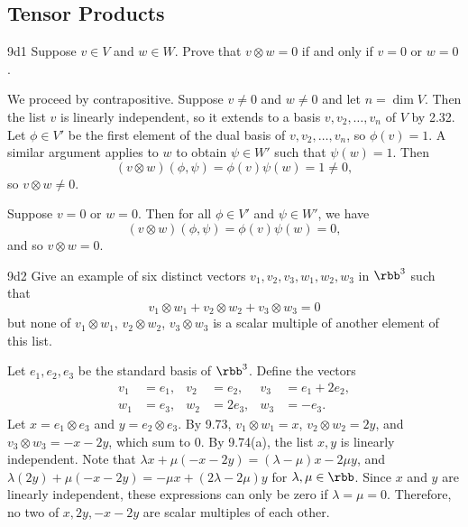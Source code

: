 \subsection{Tensor Products}

\begin{exercise}{9d1}
    Suppose $v \in V$ and $w \in W$.
    Prove that $v \otimes w = 0$ if and only if $v = 0$ or $w = 0$.
\end{exercise}

\begin{soliff}
    \rightimp We proceed by contrapositive.
    Suppose $v \neq 0$ and $w \neq 0$ and let $n = \dim V$.
    Then the list $v$ is linearly independent, so it extends to a basis $v, v_2, \ldots, v_n$ of $V$ by 2.32.
    Let $\phi \in V'$ be the first element of the dual basis of $v, v_2, \ldots, v_n$, so $\phi(v) = 1$.
    A similar argument applies to $w$ to obtain $\psi \in W'$ such that $\psi(w) = 1$.
    Then
    \[
        (v \otimes w)(\phi, \psi) = \phi(v)\psi(w) = 1 \neq 0,
    \]
    so $v \otimes w \neq 0$.

    \leftimp Suppose $v = 0$ or $w = 0$.
    Then for all $\phi \in V'$ and $\psi \in W'$, we have
    \[
        (v \otimes w)(\phi, \psi) = \phi(v)\psi(w) = 0,
    \]
    and so $v \otimes w = 0$.
\end{soliff}

\begin{exercise}{9d2}
    Give an example of six distinct vectors $v_1, v_2, v_3, w_1, w_2, w_3$ in $\rbb^3$ such that
    \[
        v_1 \otimes w_1 + v_2 \otimes w_2 + v_3 \otimes w_3 = 0
    \]
    but none of $v_1 \otimes w_1$, $v_2 \otimes w_2$, $v_3 \otimes w_3$ is a scalar multiple of another element of this list.
\end{exercise}

\begin{sol}
    Let $e_1, e_2, e_3$ be the standard basis of $\rbb^3$.
    Define the vectors
    \begin{align*}
        v_1 &= e_1, & v_2 &= e_2, & v_3 &= e_1 + 2 e_2, \\
        w_1 &= e_3, & w_2 &= 2 e_3, & w_3 &= -e_3.
    \end{align*}
    Let $x = e_1 \otimes e_3$ and $y = e_2 \otimes e_3$.
    By 9.73, $v_1 \otimes w_1 = x$, $v_2 \otimes w_2 = 2y$, and $v_3 \otimes w_3 = -x - 2y$, which sum to $0$.
    By 9.74(a), the list $x, y$ is linearly independent.
    Note that $\lambda x + \mu(-x - 2y) = (\lambda - \mu)x - 2\mu y$, and $\lambda (2y) + \mu(-x - 2y) = -\mu x + (2\lambda - 2\mu)y$ for $\lambda, \mu \in \rbb$.
    Since $x$ and $y$ are linearly independent, these expressions can only be zero if $\lambda = \mu = 0$.
    Therefore, no two of $x, 2y, -x - 2y$ are scalar multiples of each other.
\end{sol}

